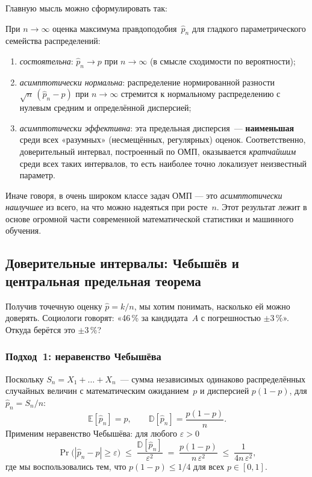 Главную мысль можно сформулировать так:

\begin{notebox}[title={Кратко об оптимальности ОМП}]
При $n\to\infty$ оценка максимума правдоподобия~$\hat p_n$ для гладкого
параметрического семейства распределений:
\begin{enumerate}\itemsep1pt
  \item \emph{состоятельна}: $\hat p_n\to p$ при $n\to\infty$
        (в смысле сходимости по вероятности);
  \item \emph{асимптотически нормальна}: распределение нормированной
        разности $\sqrt n\,(\hat p_n - p)$ при $n\to\infty$ стремится к
        нормальному распределению с нулевым средним и определённой дисперсией;
  \item \emph{асимптотически эффективна}: эта предельная дисперсия~---
        \textbf{наименьшая} среди всех «разумных» (несмещённых,
        регулярных) оценок. Соответственно, доверительный
        интервал, построенный по ОМП, оказывается \emph{кратчайшим} среди
        всех таких интервалов, то есть наиболее точно локализует
        неизвестный параметр.
\end{enumerate}
\end{notebox}

Иначе говоря, в очень широком классе задач ОМП — это \emph{асимптотически
наилучшее} из всего, на что можно надеяться при росте~$n$. Этот
результат лежит в основе огромной части современной математической
статистики и машинного обучения.

\subsection{Доверительные интервалы: Чебышёв и центральная предельная теорема}
\label{ssec:ci}

Получив точечную оценку $\hat p=k/n$, мы хотим понимать, насколько ей можно
доверять. Социологи говорят: «46\,\% за кандидата~$A$ с погрешностью
$\pm 3\,\%$». Откуда берётся это $\pm 3\,\%$?

\subsubsection*{Подход~1: неравенство Чебышёва}

Поскольку $S_n=X_1+\dots+X_n$~--- сумма независимых одинаково распределённых
случайных величин с математическим ожиданием~$p$ и дисперсией $p(1-p)$,
для $\hat p_n=S_n/n$:
\[
\mathbb E[\hat p_n]=p,\qquad
\mathbb D[\hat p_n]=\frac{p(1-p)}{n}.
\]
Применим неравенство Чебышёва: для любого $\varepsilon>0$
\begin{equation}\label{eq:cheb}
\Pr\bigl(|\hat p_n - p| \geq \varepsilon\bigr)\;\leq\;
\frac{\mathbb D[\hat p_n]}{\varepsilon^{2}}\;=\;\frac{p(1-p)}{n\,\varepsilon^{2}}
\;\leq\;\frac{1}{4n\,\varepsilon^{2}},
\end{equation}
где мы воспользовались тем, что $p(1-p)\leq 1/4$ для всех
$p\in[0,1]$.

